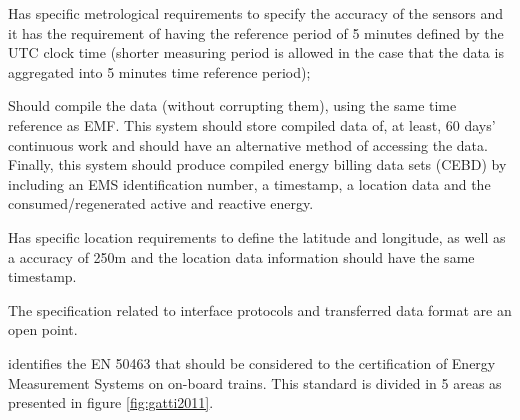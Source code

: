 \begin{description}
	\setlength\itemsep{-0.5em}
	
	\item [Energy measurement function (EMF)] Has specific metrological requirements to specify the accuracy of the sensors and it has the requirement of having the reference period of 5 minutes defined by the UTC clock time (shorter measuring period is allowed in the case that the data is aggregated into 5 minutes time reference period);
	
	\item [Data handling system (DHS)] Should compile the data (without corrupting them), using the same time reference as EMF. This system should store compiled data of, at least, 60 days' continuous work and should have an alternative method of accessing the data. Finally, this system should produce compiled energy billing data sets (CEBD) by including an EMS identification number, a timestamp, a location data and the consumed/regenerated active and reactive energy.
	
	\item [Location function] Has specific location requirements to define the latitude and longitude, as well as a accuracy of 250m and the location data information should have the same timestamp.
	
	\item [On-board to ground communication] The specification related to interface protocols and transferred data format are an open point.
	
\end{description} 


 \cite{metas2015} identifies the EN 50463 that should be considered to the certification of Energy Measurement Systems on on-board trains. This standard is divided in 5 areas as presented in figure \ref{fig:gatti2011}.
 



